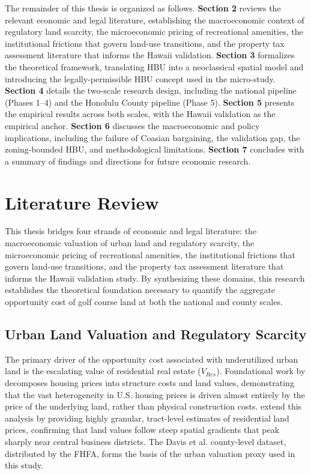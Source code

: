 \documentclass[11pt, letterpaper]{article}
\begin{document}
The remainder of this thesis is organized as follows. \textbf{Section 2} reviews the relevant economic and legal literature, establishing the macroeconomic context of regulatory land scarcity, the microeconomic pricing of recreational amenities, the institutional frictions that govern land-use transitions, and the property tax assessment literature that informs the Hawaii validation. \textbf{Section 3} formalizes the theoretical framework, translating HBU into a neoclassical spatial model and introducing the legally-permissible HBU concept used in the micro-study. \textbf{Section 4} details the two-scale research design, including the national pipeline (Phases 1--4) and the Honolulu County pipeline (Phase 5). \textbf{Section 5} presents the empirical results across both scales, with the Hawaii validation as the empirical anchor. \textbf{Section 6} discusses the macroeconomic and policy implications, including the failure of Coasian bargaining, the validation gap, the zoning-bounded HBU, and methodological limitations. \textbf{Section 7} concludes with a summary of findings and directions for future economic research.

\newpage

\section{Literature Review}

This thesis bridges four strands of economic and legal literature: the macroeconomic valuation of urban land and regulatory scarcity, the microeconomic pricing of recreational amenities, the institutional frictions that govern land-use transitions, and the property tax assessment literature that informs the Hawaii validation study. By synthesizing these domains, this research establishes the theoretical foundation necessary to quantify the aggregate opportunity cost of golf course land at both the national and county scales.

\subsection{Urban Land Valuation and Regulatory Scarcity}

The primary driver of the opportunity cost associated with underutilized urban land is the escalating value of residential real estate ($V_{Res}$). Foundational work by \textcite{Davis2008} decomposes housing prices into structure costs and land values, demonstrating that the vast heterogeneity in U.S. housing prices is driven almost entirely by the price of the underlying land, rather than physical construction costs. \textcite{Davis2021} extend this analysis by providing highly granular, tract-level estimates of residential land prices, confirming that land values follow steep spatial gradients that peak sharply near central business districts. The Davis et al. county-level dataset, distributed by the FHFA, forms the basis of the urban valuation proxy used in this study.
\end{document}
